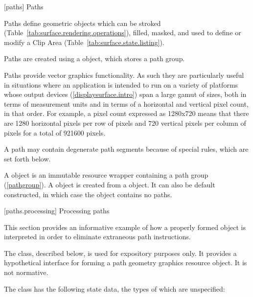 
 [paths] {Paths}

\pnum
Paths define geometric objects which can be stroked (Table~\ref{tab:surface.rendering.operations}), filled, masked, and used to define or modify a Clip Area (Table~\ref{tab:surface.state.listing}).

\pnum
Paths are created using a  object, which stores a path group. 

\pnum
Paths provide vector graphics functionality. As such they are particularly useful in situations where an application is intended to run on a variety of platforms whose output devices (\ref{displaysurface.intro}) span a large gamut of sizes, both in terms of measurement units and in terms of a horizontal and vertical pixel count, in that order. For example, a pixel count expressed as 1280x720 means that there are 1280 horizontal pixels per row of pixels and 720 vertical pixels per column of pixels for a total of 921600 pixels.
%

\pnum
A path may contain degenerate path segments because of special rules, which are set forth below.

\pnum
A  object is an immutable resource wrapper containing a path group (\ref{pathgroup}). A  object is created from a  object. It can also be default constructed, in which case the  object contains no paths.

 [paths.processing] {Processing paths}

\pnum
This section provides an informative example of how a properly formed  object is interpreted in order to eliminate extraneous path instructions.

\pnum
The  class, described below, is used for expository purposes only. It provides a hypothetical interface for forming a path geometry graphics resource object. It is not normative.

\pnum
The  class has the following state data, the types of which are unspecified:

